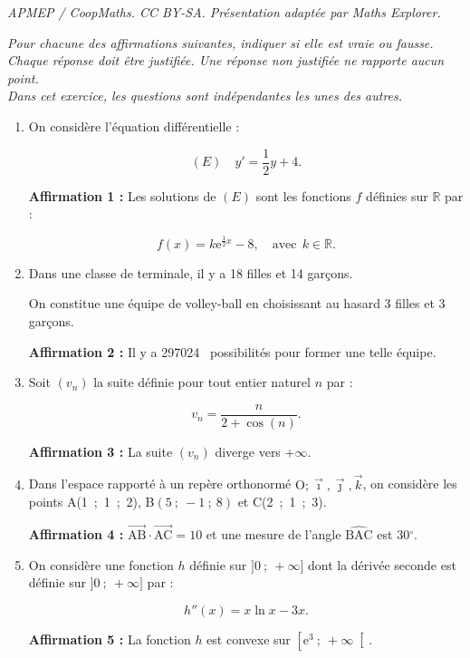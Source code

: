 \documentclass[10pt]{article}
\providecommand{\degres}{\ensuremath{^\circ}}
\providecommand{\R}{\mathbb{R}}
\providecommand{\e}{{\mathrm{e}}}
\providecommand{\vect}[1]{\overrightarrow{#1}}
\providecommand{\np}[2][]{{#2~#1}}
\providecommand{\degres}{{^\circ}}
\providecommand{\Oijk}{\(\mathrm{O};\vec{\imath},\vec{\jmath},\vec{k}\)}
\begin{document}
\noindent\textit{APMEP / CoopMaths. CC BY-SA. Présentation adaptée par Maths Explorer.}\par\medskip
\medskip

\emph{Pour chacune des affirmations suivantes, indiquer si elle est vraie ou fausse.\\
Chaque réponse doit être justifiée. Une réponse non justifiée ne rapporte aucun point.\\ Dans cet exercice, les questions sont indépendantes les unes des autres.}

\medskip

\begin{enumerate}
\item On considère l'équation différentielle :

\[(E )\quad y' = \dfrac 12y + 4.\]

\smallskip

\textbf{Affirmation 1 :} Les solutions de $(E)$ sont les fonctions $f$ définies sur $\R$ par :

\[f(x) = k\e^{\frac 12 x} - 8, \quad \text{avec}\: \: k \in \R.\]

\item Dans une classe de terminale, il y a 18 filles et 14 garçons.

On constitue une équipe de volley-ball en choisissant au hasard 3 filles et 3 garçons.

\smallskip

\textbf{Affirmation 2 :} Il y a \np{297024} possibilités pour former une telle équipe.
\item Soit $(v_n)$ la suite définie pour tout entier naturel $n$ par :

\[v_n = \dfrac{n}{2 + \cos (n)}.\]

\textbf{Affirmation 3 :} La suite $(v_n)$ diverge vers $+\infty$.
\item Dans l'espace rapporté à un repère orthonormé \Oijk, on considère les points A(1~;~1~;~2),\: B$(5~;~- 1~;~8)$ et C(2~;~1~;~3).

\textbf{Affirmation 4 :} $\vect{\text{AB}} \cdot\vect{\text{AC}} = 10$ et une mesure de l'angle $\widehat{\text{BAC}}$ est $30\degres$.
\item On considère une fonction $h$ définie sur $]0~;~+ \infty]$ dont la dérivée seconde est
définie sur $]0~;~+ \infty]$ par :

\[h''(x) = x \ln x - 3x.\]

\textbf{Affirmation 5 :}  La fonction $h$ est convexe sur $\left[\e^3~;~+\infty\right[$.
\end{enumerate}
\end{document}
